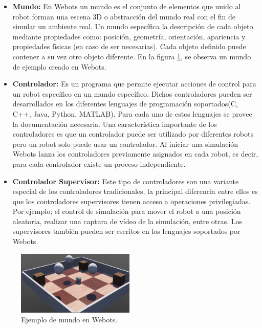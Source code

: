 \begin{itemize}
    \item \textbf{Mundo:} En Webots un mundo es el conjunto de elementos que unido al robot forman una escena 3D o abstracción del mundo real con el fin de simular un ambiente real. Un mundo específica la descripción de cada objeto mediante propiedades como: posición, geometría, orientación, apariencia y propiedades físicas (en caso de ser necesarias). Cada objeto definido puede contener a su vez otro objeto diferente\cite{Webots}. En la figura \ref{fig:webots_example}, se observa un mundo de ejemplo creado en Webots. 
    
    \item \textbf{Controlador:} Es un programa que permite ejecutar acciones de control para un robot específico en un mundo específico. Dichos controladores pueden ser desarrollados en los diferentes lenguajes de programación soportados(C, C++, Java, Python, MATLAB). Para cada uno de estos lenguajes se provee la documentación necesaria. Una característica importante de los controladores es que un controlador puede ser utilizado por diferentes robots pero un robot solo puede usar un controlador. Al iniciar una simulación Webots lanza los controladores previamente asignados en cada robot, es decir, para cada controlador existe un proceso independiente\cite{Webots}.
    
    \item \textbf{Controlador Supervisor:} Este tipo de controladores son una variante especial de los controladores tradicionales, la principal diferencia entre ellos es que los controladores supervisores tienen acceso a operaciones privilegiadas. Por ejemplo; el control de simulación para mover el robot a una posición aleatoria, realizar una captura de vídeo de la simulación, entre otras. Los supervisores también pueden ser escritos en los lenguajes soportados por Webots\cite{Webots}.
\end{itemize}

\begin{figure}[h]
    \centering
    \includegraphics[width=0.5\textwidth]{Figures/Figures_Cap03/WebotsWorldExample.png}
    \caption{Ejemplo de mundo en Webots.}
    \label{fig:webots_example}
\end{figure}

